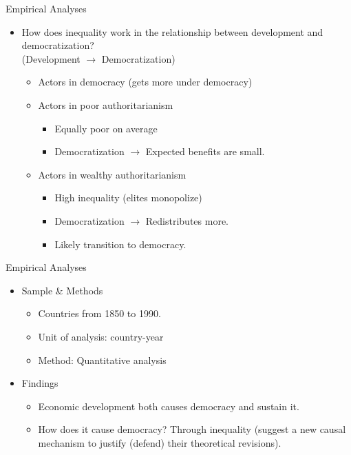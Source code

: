 \documentclass[xcolor=dvipsnames]{beamer}
\begin{document}
\begin{frame}[fragile]{Empirical Analyses}
	\begin{itemize}
	\item How does inequality work in the relationship between development and democratization?\\(Development $\rightarrow$ Democratization)
	  \begin{itemize}
	    \item Actors in democracy (gets more under democracy)
	    \item Actors in poor authoritarianism
	    \begin{itemize}
	      \item Equally poor on average
	      \item Democratization $\rightarrow$ Expected benefits are small.
	     \end{itemize}
	   \item Actors in wealthy authoritarianism
	   \begin{itemize}
	      \item High inequality (elites monopolize)
	      \item Democratization $\rightarrow$ Redistributes more.
	      \item Likely transition to democracy.
	   \end{itemize}
	  \end{itemize}
	\end{itemize}
\end{frame}

	
\begin{frame}[fragile]{Empirical Analyses}
	\begin{itemize}	
	 \item Sample \& Methods
	 \begin{itemize}
	  \item Countries from 1850 to 1990.
	  \item Unit of analysis: country-year
	  \item Method: Quantitative analysis
	 \end{itemize} 
	 \item Findings
	  \begin{itemize}
	    \item Economic development both causes democracy and sustain it.
	    \item How does it cause democracy? Through inequality (suggest a new causal mechanism to justify (defend) their theoretical revisions).
	  \end{itemize}
	\end{itemize}
	\end{frame}
	
\end{document}
